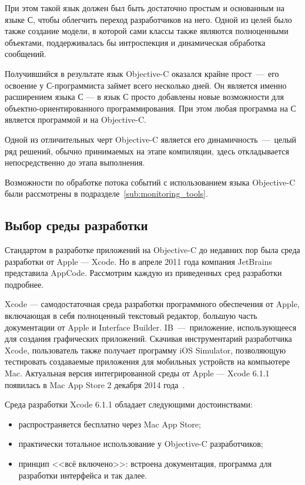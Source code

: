 При этом такой язык должен был быть достаточно простым и основанным на языке С,
чтобы облегчить переход разработчиков на него. Одной из целей было также
создание модели, в которой сами классы также являются полноценными объектами,
поддерживалась бы интроспекция и динамическая обработка сообщений.

Получившийся в результате язык Objective-C оказался крайне прост~---~его освоение
у С-программиста займет всего несколько дней. Он является именно расширением
языка С --- в язык С просто добавлены новые возможности для
объектно-ориентированного программирования. При этом любая программа на С
является программой и на Objective-C.

Одной из отличительных черт Objective-C является его динамичность~---~целый ряд
решений, обычно принимаемых на этапе компиляции, здесь откладывается
непосредственно до этапа выполнения.

Возможности по обработке потока событий с использованием языка Objective-C
были рассмотрены в подразделе~\ref{sub:monitoring_tools}.


\subsection{Выбор среды разработки}

Стандартом в разработке приложений на Objective-C до недавних пор была
среда разработки от Apple --- Xcode. Но в апреле 2011 года компания JetBrains
представила AppCode. Рассмотрим каждую из приведенных сред разработки подробнее.

Xcode --- самодостаточная среда разработки программного обеспечения от Apple,
включающая в себя полноценный текстовый редактор, большую часть документации
от Apple и Interface Builder. IB~---~приложение, использующееся для создания
графических приложений. Скачивая инструментарий разработчика Xcode,
пользователь также получает программу iOS Simulator, позволяющую тестировать
создаваемые приложения для мобильных устройств на компьютере Mac.
Актуальная версия интегрированной среды от Apple --- Xcode 6.1.1
появилась в Mac App Store 2 декабря 2014 года~\cite{xcode_ide}.

Среда разработки Xcode 6.1.1 обладает следующими достоинствами:
\begin{itemize}
  \item распространяется бесплатно через Mac App Store;
  \item практически тотальное использование у Objective-C разработчиков;
  \item принцип <<всё включено>>: встроена документация, программа для
    разработки интерфейса и так далее.
\end{itemize}

